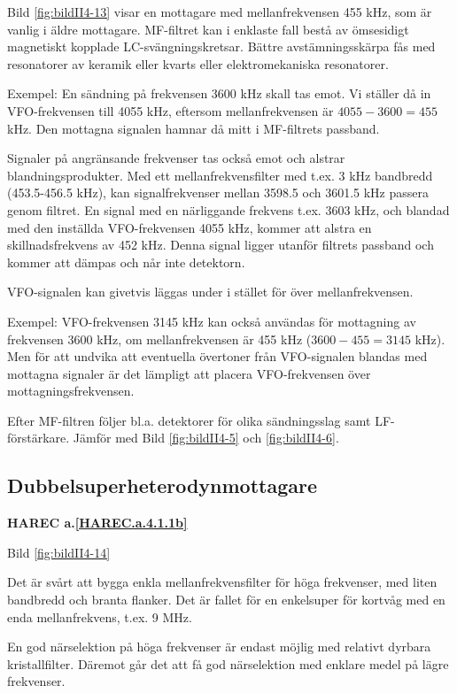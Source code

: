Bild \ref{fig:bildII4-13} visar en mottagare med mellanfrekvensen 455 kHz, som är
vanlig i äldre mottagare. MF-filtret kan i enklaste fall bestå av
ömsesidigt magnetiskt kopplade LC-svängningskretsar. Bättre
avstämningsskärpa fås med resonatorer av keramik eller kvarts eller
elektromekaniska resonatorer.

Exempel: En sändning på frekvensen 3600 kHz skall tas emot. Vi ställer
då in VFO-frekvensen till 4055 kHz, eftersom mellanfrekvensen är
\(4055 - 3600 = 455\) kHz. Den mottagna signalen hamnar då mitt i
MF-filtrets passband.

Signaler på angränsande frekvenser tas också emot och alstrar
blandningsprodukter.  Med ett mellanfrekvensfilter med t.ex. 3 kHz
bandbredd (453.5-456.5 kHz), kan signalfrekvenser mellan 3598.5 och
3601.5 kHz passera genom filtret. En signal med en närliggande
frekvens t.ex. 3603 kHz, och blandad med den inställda VFO-frekvensen
4055 kHz, kommer att alstra en skillnadsfrekvens av 452 kHz. Denna
signal ligger utanför filtrets passband och kommer att dämpas och når
inte detektorn.

VFO-signalen kan givetvis läggas under i stället för över
mellanfrekvensen.

Exempel: VFO-frekvensen 3145 kHz kan också användas för mottagning av
frekvensen 3600 kHz, om mellanfrekvensen är 455 kHz (\(3600 - 455 =
3145\) kHz). Men för att undvika att eventuella övertoner från
VFO-signalen blandas med mottagna signaler är det lämpligt att placera
VFO-frekvensen över mottagningsfrekvensen.

Efter MF-filtren följer bl.a. detektorer för olika sändningsslag samt
LF-förstärkare.  Jämför med Bild \ref{fig:bildII4-5} och \ref{fig:bildII4-6}.

\subsection{Dubbelsuperheterodynmottagare}
\textbf{HAREC a.\ref{HAREC.a.4.1.1b}\label{myHAREC.a.4.1.1b}}

Bild \ref{fig:bildII4-14}

Det är svårt att bygga enkla mellanfrekvensfilter för höga frekvenser,
med liten bandbredd och branta flanker. Det är fallet för en
enkelsuper för kortvåg med en enda mellanfrekvens, t.ex. 9 MHz.

En god närselektion på höga frekvenser är endast möjlig med relativt
dyrbara kristallfilter. Däremot går det att få god närselektion med
enklare medel på lägre frekvenser.

